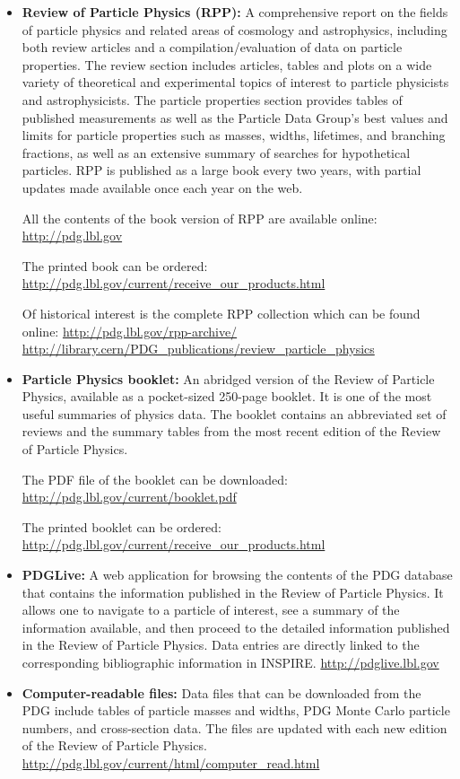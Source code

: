\begin{itemize}
\item
  \textbf{Review of Particle Physics (RPP):} A comprehensive report on
  the fields of particle physics and related areas of cosmology and
  astrophysics, including both review articles and a
  compilation/evaluation of data on particle properties. The review
  section includes articles, tables and plots on a wide variety of
  theoretical and experimental topics of interest to particle physicists
  and astrophysicists. The particle properties section provides tables
  of published measurements as well as the Particle Data Group's best
  values and limits for particle properties such as masses, widths,
  lifetimes, and branching fractions, as well as an extensive summary of
  searches for hypothetical particles. RPP is published as a large book
  every two years, with partial updates made available once each year on
  the web.

  All the contents of the book version of RPP are available online:
  \url{http://pdg.lbl.gov}

  The printed book can be ordered:
  \url{http://pdg.lbl.gov/current/receive_our_products.html}

  Of historical interest is the complete RPP collection which can be
  found online: \url{http://pdg.lbl.gov/rpp-archive/}
  \url{http://library.cern/PDG_publications/review_particle_physics}
\item
  \textbf{Particle Physics booklet:} An abridged version of the Review
  of Particle Physics, available as a pocket-sized 250-page booklet. It
  is one of the most useful summaries of physics data. The booklet
  contains an abbreviated set of reviews and the summary tables from the
  most recent edition of the Review of Particle Physics.

  The PDF file of the booklet can be downloaded:
  \url{http://pdg.lbl.gov/current/booklet.pdf}

  The printed booklet can be ordered:
  \url{http://pdg.lbl.gov/current/receive_our_products.html}
\item
{}
  \textbf{PDGLive:} A web application for browsing the contents of the
  PDG database that contains the information published in the Review of
  Particle Physics. It allows one to navigate to a particle of interest,
  see a summary of the information available, and then proceed to the
  detailed information published in the Review of Particle Physics. Data
  entries are directly linked to the corresponding bibliographic
  information in INSPIRE. \url{http://pdglive.lbl.gov}
\item
{}
  \textbf{Computer-readable files:} Data files that can be downloaded
  from the PDG include tables of particle masses and widths, PDG Monte
  Carlo particle numbers, and cross-section data. The files are updated
  with each new edition of the Review of Particle Physics.
  \url{http://pdg.lbl.gov/current/html/computer_read.html}
\end{itemize}


